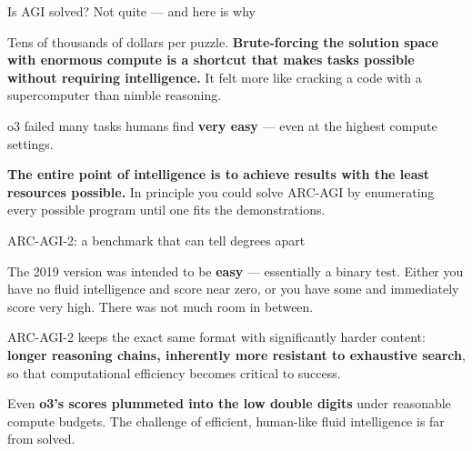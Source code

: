 \documentclass[aspectratio=169,11pt,t]{beamer}
\begin{document}
\begin{frame}[shrink=25]{Is AGI solved? Not quite --- and here is why}
\begin{minipage}[t]{0.494\textwidth}
\begin{icardwarn}
Tens of thousands of dollars per puzzle. \textbf{Brute-forcing the solution space with enormous compute is a shortcut that makes tasks possible without requiring intelligence.} It felt more like cracking a code with a supercomputer than nimble reasoning.
\end{icardwarn}
\end{minipage}%
\hfill
\begin{minipage}[t]{0.494\textwidth}
\begin{icardwarn}
o3 failed many tasks humans find \textbf{very easy} --- even at the highest compute settings.
\end{icardwarn}
\end{minipage}%
\begin{iband}[signal]
\textbf{The entire point of intelligence is to achieve results with the least resources possible.} In principle you could solve ARC-AGI by enumerating every possible program until one fits the demonstrations. 
\end{iband}
\end{frame}

\begin{frame}[shrink=25]{ARC-AGI-2: a benchmark that can tell degrees apart}
{\fontsize{9.4}{12.6}\selectfont\color{fg2}The 2019 version was intended to be \textbf{easy} --- essentially a binary test. Either you have no fluid intelligence and score near zero, or you have some and immediately score very high. There was not much room in between.\par}\vskip 4pt
{\fontsize{9.4}{12.6}\selectfont\color{fg2}ARC-AGI-2 keeps the exact same format with significantly harder content: \textbf{longer reasoning chains, inherently more resistant to exhaustive search}, so that computational efficiency becomes critical to success.\par}\vskip 4pt
\begin{minipage}[t]{0.3253\textwidth}
\end{minipage}%
\hfill
\begin{minipage}[t]{0.3253\textwidth}
\end{minipage}%
\hfill
\begin{minipage}[t]{0.3253\textwidth}
\end{minipage}%
{\fontsize{9.4}{12.6}\selectfont\color{fg2}Even \textbf{o3's scores plummeted into the low double digits} under reasonable compute budgets. The challenge of efficient, human-like fluid intelligence is far from solved.\par}\vskip 4pt
\end{frame}
\end{document}

